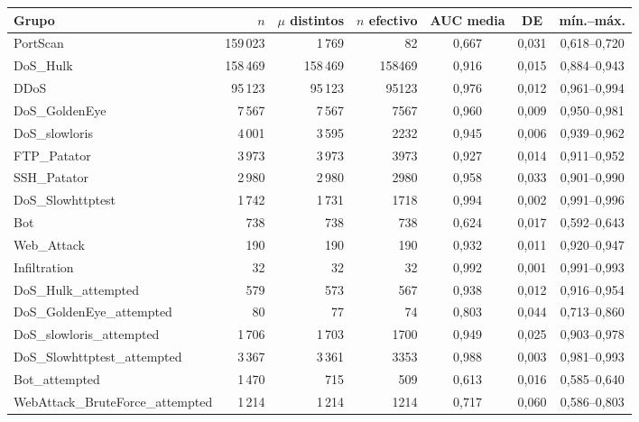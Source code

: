 \begin{tabular}{@{}lrrrccc@{}}
\toprule
Grupo & $n$ & $\mu$ distintos & $n$ efectivo & AUC media & DE & mín.--máx. \\
\midrule
PortScan & 159\,023 & 1\,769 & 82 & 0{,}667 & 0{,}031 & 0{,}618--0{,}720 \\
DoS\_Hulk & 158\,469 & 158\,469 & 158469 & 0{,}916 & 0{,}015 & 0{,}884--0{,}943 \\
DDoS & 95\,123 & 95\,123 & 95123 & 0{,}976 & 0{,}012 & 0{,}961--0{,}994 \\
DoS\_GoldenEye & 7\,567 & 7\,567 & 7567 & 0{,}960 & 0{,}009 & 0{,}950--0{,}981 \\
DoS\_slowloris & 4\,001 & 3\,595 & 2232 & 0{,}945 & 0{,}006 & 0{,}939--0{,}962 \\
FTP\_Patator & 3\,973 & 3\,973 & 3973 & 0{,}927 & 0{,}014 & 0{,}911--0{,}952 \\
SSH\_Patator & 2\,980 & 2\,980 & 2980 & 0{,}958 & 0{,}033 & 0{,}901--0{,}990 \\
DoS\_Slowhttptest & 1\,742 & 1\,731 & 1718 & 0{,}994 & 0{,}002 & 0{,}991--0{,}996 \\
Bot & 738 & 738 & 738 & 0{,}624 & 0{,}017 & 0{,}592--0{,}643 \\
Web\_Attack & 190 & 190 & 190 & 0{,}932 & 0{,}011 & 0{,}920--0{,}947 \\
Infiltration & 32 & 32 & 32 & 0{,}992 & 0{,}001 & 0{,}991--0{,}993 \\
\midrule
DoS\_Hulk\_attempted & 579 & 573 & 567 & 0{,}938 & 0{,}012 & 0{,}916--0{,}954 \\
DoS\_GoldenEye\_attempted & 80 & 77 & 74 & 0{,}803 & 0{,}044 & 0{,}713--0{,}860 \\
DoS\_slowloris\_attempted & 1\,706 & 1\,703 & 1700 & 0{,}949 & 0{,}025 & 0{,}903--0{,}978 \\
DoS\_Slowhttptest\_attempted & 3\,367 & 3\,361 & 3353 & 0{,}988 & 0{,}003 & 0{,}981--0{,}993 \\
Bot\_attempted & 1\,470 & 715 & 509 & 0{,}613 & 0{,}016 & 0{,}585--0{,}640 \\
WebAttack\_BruteForce\_attempted & 1\,214 & 1\,214 & 1214 & 0{,}717 & 0{,}060 & 0{,}586--0{,}803 \\
\bottomrule
\end{tabular}
